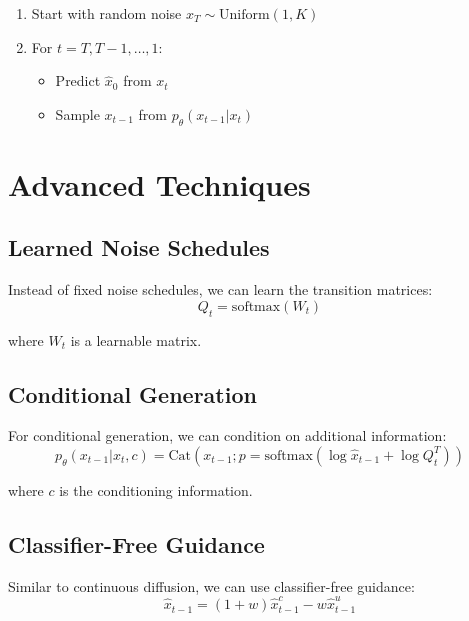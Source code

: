\begin{enumerate}
    \item Start with random noise $x_T \sim \text{Uniform}(1, K)$
    \item For $t = T, T-1, \ldots, 1$:
    \begin{itemize}
        \item Predict $\hat{x}_0$ from $x_t$
        \item Sample $x_{t-1}$ from $p_\theta(x_{t-1} | x_t)$
    \end{itemize}
\end{enumerate}

\section{Advanced Techniques}

\subsection{Learned Noise Schedules}

Instead of fixed noise schedules, we can learn the transition matrices:
\begin{equation}
    Q_t = \text{softmax}(W_t)
\end{equation}

where $W_t$ is a learnable matrix.

\subsection{Conditional Generation}

For conditional generation, we can condition on additional information:
\begin{equation}
    p_\theta(x_{t-1} | x_t, c) = \text{Cat}(x_{t-1}; p = \text{softmax}(\log \hat{x}_{t-1} + \log Q_t^T))
\end{equation}

where $c$ is the conditioning information.

\subsection{Classifier-Free Guidance}

Similar to continuous diffusion, we can use classifier-free guidance:
\begin{equation}
    \hat{x}_{t-1} = (1 + w) \hat{x}_{t-1}^c - w \hat{x}_{t-1}^u
\end{equation}

